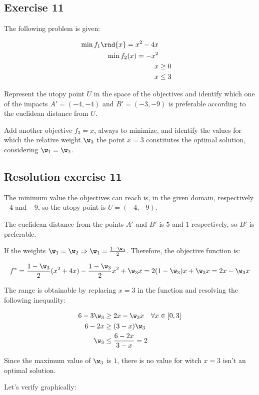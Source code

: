 \documentclass[\main/main.tex]{subfiles}
\begin{document}
\subsection{Exercise 11}
The following problem is given:

\begin{align*}
  \min f_1\rnd{x} = x^2 - 4x \\
  \min f_2(x) = -x^2         \\
  x & \geq 0                 \\
  x & \leq 3                 \\
\end{align*}


Represent the utopy point $U$ in the space of the objectives and identify which one of the impacts $A' = (-4, -4)$ and $B' = (-3, -9)$ is preferable according to the euclidean distance from $U$.

Add another objective $f_3 = x$, always to minimize, and identify the values for which the relative weight $\w_3$ the point $x = 3$ constitutes the optimal solution, considering $\w_1 = \w_2$.

\subsection{Resolution exercise 11}
The minimum value the objectives can reach is, in the given domain, respectively $-4$ and $-9$, so the utopy point is $U = (-4, -9)$.

The euclidean distance from the points $A'$ and $B'$ is $5$ and $1$ respectively, so $B'$ is preferable.

If the weights $\w_1 = \w_2 \Rightarrow \w_1 = \frac{1 - \w_3}{2}$. Therefore, the objective function is:

\[
  f^* = \frac{1 - \w_3}{2}(x^2+4x) - \frac{1 - \w_3}{2}x^2 + \w_3 x = 2(1 - \w_3)x + \w_3x = 2x - \w_3x
\]

The range is obtainable by replacing $x=3$ in the function and resolving the following inequality:

\begin{align*}
  6 - 3\w_3 & \geq 2x - \w_3x \quad \forall x \in [0,3] \\
  6 - 2x    & \geq (3-x)\w_3                            \\
  \w_3      & \leq \frac{6-2x}{3-x} = 2
\end{align*}

Since the maximum value of $\w_3$ is $1$, there is no value for witch $x = 3$ isn't an optimal solution.

Let's verify graphically:

\begin{figure}

\end{figure}
\end{document}

